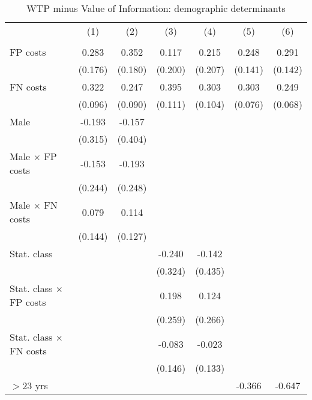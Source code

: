 \begin{table}[htbp]\centering
\caption{WTP minus Value of Information: demographic determinants}
\begin{tabular}{l*{6}{c}}
\hline\hline
                &\multicolumn{1}{c}{(1)}&\multicolumn{1}{c}{(2)}&\multicolumn{1}{c}{(3)}&\multicolumn{1}{c}{(4)}&\multicolumn{1}{c}{(5)}&\multicolumn{1}{c}{(6)}\\
                &\multicolumn{1}{c}{}&\multicolumn{1}{c}{}&\multicolumn{1}{c}{}&\multicolumn{1}{c}{}&\multicolumn{1}{c}{}&\multicolumn{1}{c}{}\\
\hline
FP costs        &    0.283&    0.352&    0.117&    0.215&    0.248&    0.291\\
                &  (0.176)&  (0.180)&  (0.200)&  (0.207)&  (0.141)&  (0.142)\\
FN costs        &    0.322&    0.247&    0.395&    0.303&    0.303&    0.249\\
                &  (0.096)&  (0.090)&  (0.111)&  (0.104)&  (0.076)&  (0.068)\\
Male            &   -0.193&   -0.157&         &         &         &         \\
                &  (0.315)&  (0.404)&         &         &         &         \\
Male $\times$ FP costs&   -0.153&   -0.193&         &         &         &         \\
                &  (0.244)&  (0.248)&         &         &         &         \\
Male $\times$ FN costs&    0.079&    0.114&         &         &         &         \\
                &  (0.144)&  (0.127)&         &         &         &         \\
Stat. class     &         &         &   -0.240&   -0.142&         &         \\
                &         &         &  (0.324)&  (0.435)&         &         \\
Stat. class $\times$ FP costs&         &         &    0.198&    0.124&         &         \\
                &         &         &  (0.259)&  (0.266)&         &         \\
Stat. class $\times$ FN costs&         &         &   -0.083&   -0.023&         &         \\
                &         &         &  (0.146)&  (0.133)&         &         \\
$>$23 yrs       &         &         &         &         &   -0.366&   -0.647\\

\end{tabular}
\end{table}
